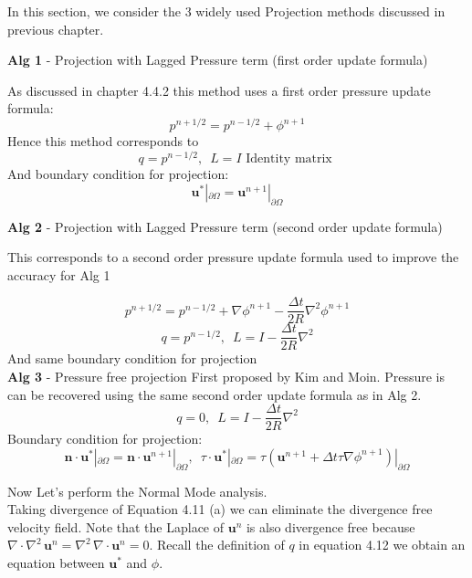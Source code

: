 In this section, we consider the 3 widely used Projection methods discussed in previous chapter.

\textbf{Alg 1} - Projection with Lagged Pressure term (first order update formula)

As discussed in chapter 4.4.2 this method uses a first order pressure update formula:
\begin{equation*}
p^{n+1/2} = p^{n-1/2} + \phi^{n+1}
\end{equation*}
Hence this method corresponds to
\begin{equation*}
q = p^{n-1/2}, \, \, \, L = I \text{   Identity matrix   }
\end{equation*}
And boundary condition for projection:
\begin{equation*}
\textbf{u}^* |_{\partial \Omega} = \textbf{u}^{n+1} |_{\partial \Omega}
\end{equation*}

\textbf{Alg 2} - Projection with Lagged Pressure term (second order update formula)

This corresponds to a second order pressure update formula used to improve the accuracy for Alg 1

\begin{equation*}
p^{n+1/2} = p^{n-1/2} + \nabla \phi^{n+1} - \dfrac{\Delta t}{2 R} \nabla^2 \phi^{n+1}
\end{equation*}
\begin{equation*}
q = p^{n-1/2}, \, \, \, L = I - \dfrac{\Delta t}{2 R} \nabla^2
\end{equation*}
And same boundary condition for projection\\

\textbf{Alg 3} - Pressure free projection
First proposed by Kim and Moin. Pressure is can be recovered using the same second order update formula as in Alg 2. \cite{kim1985application,brown2001accurate}
\begin{equation*}
q = 0, \, \, \, L = I - \dfrac{\Delta t}{2 R} \nabla^2
\end{equation*}
Boundary condition for projection:
\begin{equation*}
\textbf{n} \cdot \textbf{u}^* |_{\partial \Omega} = \textbf{n} \cdot \textbf{u}^{n+1} |_{\partial \Omega}, \, \, \, \textbf{$\tau$} \cdot \textbf{u}^* |_{\partial \Omega} = \textbf{$\tau$} \left(\textbf{u}^{n+1}+ \Delta t \textbf{$\tau$} \nabla \phi^{n+1}\right) |_{\partial \Omega}
\end{equation*}

Now Let's perform the Normal Mode analysis.\\
Taking divergence of Equation 4.11 (a) we can eliminate the divergence free velocity field. Note that the Laplace of $\textbf{u}^n$ is also divergence free because $\nabla \cdot \nabla^2 \,\textbf{u}^n = \nabla^2 \,\nabla \cdot \textbf{u}^n = 0$. Recall the definition of $q$ in equation 4.12 we obtain an equation between $\textbf{u}^*$ and $\phi$.

